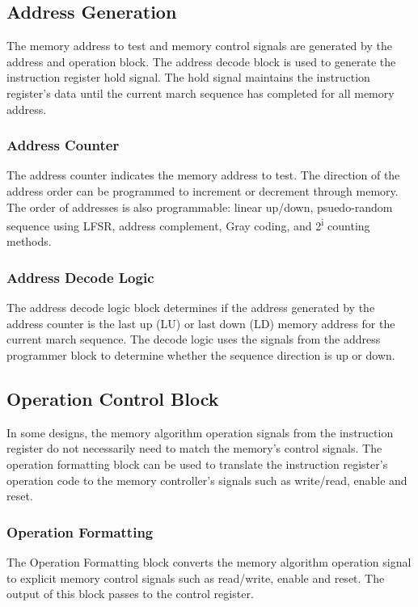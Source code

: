 \subsection{Address Generation}
The memory address to test and memory control signals are generated by the address and operation block.  The address decode block is used to generate the instruction register hold signal.  The hold signal maintains the instruction register's data until the current march sequence has completed for all memory address.  

\subsubsection{Address Counter}
The address counter indicates the memory address to test.  The direction of the address order can be programmed to increment or decrement through memory.  The order of addresses is also programmable: linear up/down, psuedo-random sequence using LFSR, address complement, Gray coding, and 2\textsuperscript{i} counting methods.
 
\subsubsection{Address Decode Logic}
The address decode logic block determines if the address generated by the address counter is the last up (LU) or last down (LD) memory address for the current march sequence.  The decode logic uses the signals from the address programmer block to determine whether the sequence direction is up or down.   

\subsection{Operation Control Block}
In some designs, the memory algorithm operation signals from the instruction register do not necessarily need to match the memory's control signals.  The operation formatting block can be used to translate the instruction register's operation code to the memory controller's signals such as write/read, enable and reset.

\subsubsection{Operation Formatting}
The Operation Formatting block converts the memory algorithm operation signal to explicit memory control signals such as read/write, enable and reset.  The output of this block passes to the control register.

